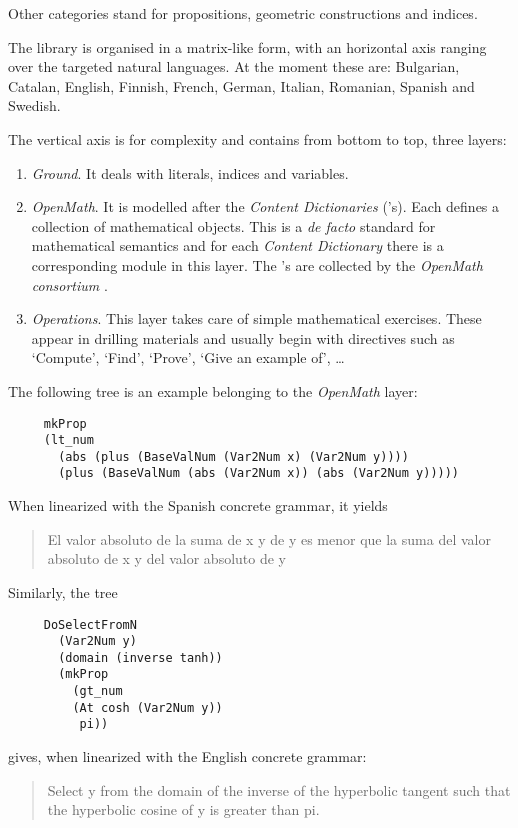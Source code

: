 \documentclass[adraft,copyright,creativecommons]{eptcs}
\begin{document}
Other categories stand for propositions, geometric constructions and
indices.

The library is organised in a matrix-like form, with an horizontal axis
ranging over the targeted natural languages.  At the moment these are:
Bulgarian,
Catalan, English, Finnish, French, German, Italian, Romanian, Spanish and
Swedish.

The vertical axis is for complexity and contains from bottom to top, three
layers:

\begin{enumerate}
\item\emph{Ground}. It deals with literals, indices and variables.
\item\emph{OpenMath}. It is modelled after the \OM{ } \emph{Content
Dictionaries} (\CD's). Each \CD{} defines a collection of
mathematical objects. This is a \emph{de facto} standard for mathematical
semantics and for each \emph{Content Dictionary}
there is a corresponding module in this layer.
The \CD's are collected by the
\emph{OpenMath consortium} \cite{OpenMath}.
\item\emph{Operations}.
This layer takes care of simple mathematical exercises. These appear
in drilling materials and usually begin with directives such as
`Compute', `Find', `Prove', `Give an example of', \ldots
\end{enumerate}

The following tree is an example belonging to the \emph{OpenMath} layer:
\begin{lstlisting}
     mkProp
     (lt_num
       (abs (plus (BaseValNum (Var2Num x) (Var2Num y))))
       (plus (BaseValNum (abs (Var2Num x)) (abs (Var2Num y)))))
\end{lstlisting}
When linearized with the Spanish concrete grammar, it yields
\begin{quote}
El valor absoluto de la suma  de x y de y es menor que la suma del valor
absoluto  de x y del valor absoluto de y
\end{quote}


Similarly, the tree
\begin{lstlisting}
     DoSelectFromN
       (Var2Num y)
       (domain (inverse tanh))
       (mkProp
         (gt_num
         (At cosh (Var2Num y))
          pi))
\end{lstlisting}
gives, when linearized with the English concrete grammar:
\begin{quote}
Select y from the domain of the inverse of the hyperbolic tangent such that
the hyperbolic cosine of y is greater than pi.
\end{quote}
\end{document}
